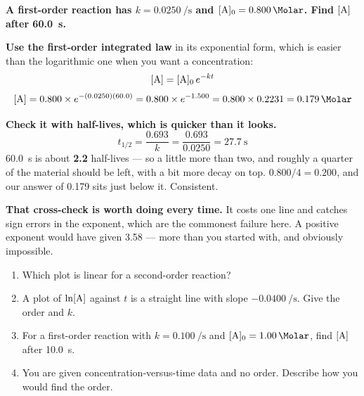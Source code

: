 \documentclass{apchem-worksheet}
\begin{document}
\begin{workedexample}
\textbf{A first-order reaction has $k = \SI{0.0250}{\per\second}$ and
$[\ce{A}]_{0} = \SI{0.800}{\Molar}$. Find $[\ce{A}]$ after
\SI{60.0}{\second}.}

\textbf{Use the first-order integrated law} in its exponential form,
which is easier than the logarithmic one when you want a concentration:
\[ [\ce{A}] = [\ce{A}]_{0}\,e^{-kt} \]
\[ [\ce{A}] = 0.800 \times e^{-(0.0250)(60.0)}
            = 0.800 \times e^{-1.500}
            = 0.800 \times 0.2231
            = \mathbf{\SI{0.179}{\Molar}} \]

\textbf{Check it with half-lives, which is quicker than it looks.}
\[ t_{1/2} = \frac{0.693}{k} = \frac{0.693}{0.0250}
           = \SI{27.7}{\second} \]
\SI{60.0}{\second} is about \textbf{2.2} half-lives --- so a little more
than two, and roughly a quarter of the material should be left, with a
bit more decay on top. $0.800/4 = 0.200$, and our answer of
\SI{0.179}{\Molar} sits just below it. Consistent.

\textbf{That cross-check is worth doing every time.} It costs one line
and catches sign errors in the exponent, which are the commonest failure
here. A positive exponent would have given \SI{3.58}{\Molar} --- more
than you started with, and obviously impossible.
\end{workedexample}

\begin{yourturn}
\begin{enumerate}[leftmargin=*,itemsep=0.5em]
  \item Which plot is linear for a second-order reaction?
        \workspace[1.4cm]
  \item A plot of $\ln[\ce{A}]$ against $t$ is a straight line with
        slope $\SI{-0.0400}{\per\second}$. Give the order and $k$.
        \workspace[1.8cm]
  \item For a first-order reaction with $k = \SI{0.100}{\per\second}$
        and $[\ce{A}]_{0} = \SI{1.00}{\Molar}$, find $[\ce{A}]$ after
        \SI{10.0}{\second}. \workspace[1.8cm]
  \item You are given concentration-versus-time data and no order.
        Describe how you would find the order. \workspace[1.8cm]
\end{enumerate}
\end{yourturn}
\end{document}
